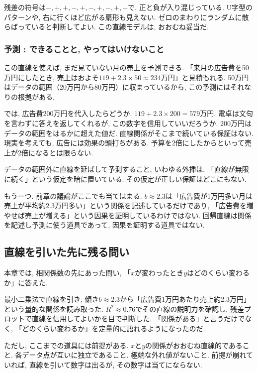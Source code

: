 
残差の符号は$-, +, +, -, +, -, +, -, +, -$で, 正と負が入り混じっている.
U字型のパターンや, 右に行くほど広がる扇形も見えない.
ゼロのまわりにランダムに散らばっていると判断してよい.
この直線モデルは, おおむね妥当だ.

\subsubsection*{予測 : できることと, やってはいけないこと}

この直線を使えば, まだ見ていない月の売上を予測できる.
「来月の広告費を50万円にしたとき, 売上はおよそ$119 + 2.3 \times 50 \approx 234$万円」と見積もれる.
50万円はデータの範囲（20万円から80万円）に収まっているから, この予測にはそれなりの根拠がある.

では, 広告費200万円を代入したらどうか.
$119 + 2.3 \times 200 = 579$万円.
電卓は文句を言わずに答えを返してくれるが, この数字を信用していいだろうか.
200万円はデータの範囲をはるかに超えた値だ.
直線関係がそこまで続いている保証はない.
現実を考えても, 広告には効果の頭打ちがある.
予算を2倍にしたからといって売上が2倍になるとは限らない.

データの範囲外に直線を延ばして予測すること, いわゆる外挿は, 「直線が無限に続く」という仮定を暗に置いている.
その仮定が正しい保証はどこにもない.

もう一つ.
前章の議論がここでも当てはまる.
$b \approx 2.3$は「広告費が1万円多い月は売上が平均約2.3万円多い」という関係を記述しているだけであり, 「広告費を増やせば売上が増える」という因果を証明しているわけではない.
回帰直線は関係を記述し予測に使う道具であって, 因果を証明する道具ではない.


\subsection{直線を引いた先に残る問い}

本章では, 相関係数の先にあった問い, 「$x$が変わったとき$y$はどのくらい変わるか」に答えた.

最小二乗法で直線を引き, 傾き$b \approx 2.3$から「広告費1万円あたり売上約2.3万円」という量的な関係を読み取った.
$R^2 \approx 0.76$でその直線の説明力を確認し, 残差プロットで直線を信用してよいかを目で判断した.
「関係がある」と言うだけでなく, 「どのくらい変わるか」を定量的に語れるようになったのだ.

ただし, ここまでの道具には前提がある.
$x$と$y$の関係がおおむね直線的であること.
各データ点が互いに独立であること.
極端な外れ値がないこと.
前提が崩れていれば, 直線を引いて数字は出るが, その数字は当てにならない.

